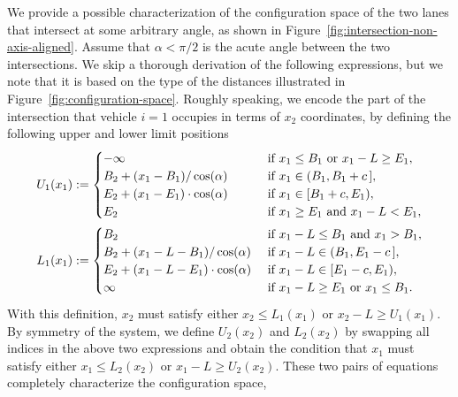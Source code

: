 \documentclass[a4paper]{report}
\theoremstyle{definition}
\theoremstyle{plain}
\newcommand\halfopen[2]{\ensuremath{[#1,#2)}}
\newcommand\openhalf[2]{\ensuremath{(#1,#2]}}
\begin{document}
We provide a possible characterization of the configuration space of the two
lanes that intersect at some arbitrary angle, as shown in
Figure~\ref{fig:intersection-non-axis-aligned}.
Assume that $\alpha < \pi / 2$ is the acute angle between the two intersections.
We skip a thorough derivation of the following expressions, but we note that it
is based on the type of the distances illustrated in
Figure~\ref{fig:configuration-space}.
%
Roughly speaking, we encode the part of the intersection that vehicle $i=1$
occupies in terms of $x_{2}$ coordinates, by defining the following upper and
lower limit positions
\begin{align}
  U_{1}(x_{1}) &:=
  \begin{cases}
    -\infty & \hspace{1.9em} \text{ if } x_{1} \leq B_{1} \text{ or } x_{1} - L \geq E_{1} , \\
    B_{2} + (x_{1} - B_{1}) / \cos(\alpha) & \hspace{1.9em} \text{ if } x_{1} \in \openhalf{B_{1}}{B_{1} + c\,} , \\
    E_{2} + (x_{1} - E_{1}) \cdot \cos(\alpha) & \hspace{1.9em} \text{ if } x_{1} \in \halfopen{B_{1} + c}{E_{1}} , \\
    E_{2} & \hspace{1.9em} \text{ if } x_{1} \geq E_{1} \text{ and } x_{1} - L < E_{1} ,
  \end{cases} \\
  L_{1}(x_{1}) &:=
  \begin{cases}
    B_{2} & \text{ if } x_{1} - L \leq B_{1} \text{ and } x_{1} > B_{1} , \\
    B_{2} + (x_{1} - L - B_{1}) / \cos(\alpha)     & \text{ if } x_{1} - L \in \openhalf{B_{1}}{E_{1} - c\,} , \\
    E_{2} + (x_{1} - L - E_{1}) \cdot \cos(\alpha) & \text{ if } x_{1} - L \in \halfopen{E_{1} - c}{E_{1}} , \\
    \infty & \text{ if } x_{1} - L \geq E_{1} \text{ or } x_{1} \leq B_{1} .
  \end{cases}
\end{align}
With this definition, $x_{2}$ must satisfy either $x_{2} \leq L_{1}(x_{1})$ or
$x_{2} - L \geq U_{1}(x_{1})$.
%
By symmetry of the system, we define $U_{2}(x_{2})$ and $L_{2}(x_{2})$ by
swapping all indices in the above two expressions and obtain the condition that
$x_{1}$ must satisfy either $x_{1} \leq L_{2}(x_{2})$ or
$x_{1} - L \geq U_{2}(x_{2})$.
%
These two pairs of equations completely characterize the configuration space,
\end{document}
